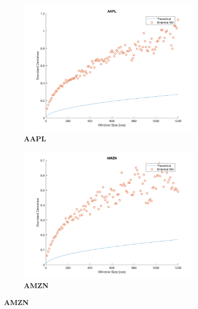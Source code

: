 \begin{figure}[htbp]

\centering
\begin{subfigure}[t]{0.49\textwidth}
\captionsetup{labelformat=empty}

\caption{\textbf{AAPL}}
\includegraphics[width=\textwidth, trim = 0 0 0 30, clip]{CHPDO_Fit/AAPL_Plot_CHPDO_21600.png}

\end{subfigure}
\begin{subfigure}[t]{0.49\textwidth}
\captionsetup{labelformat=empty}

\caption{\textbf{AMZN}}
\includegraphics[width=\textwidth, trim = 0 0 0 30, clip]{CHPDO_Fit/AMZN_Plot_CHPDO_21600.png}
\end{subfigure}


\end{figure}
